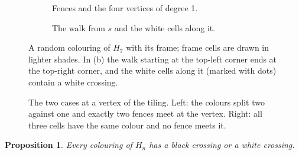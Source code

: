 \documentclass[11pt,a4paper]{amsart}
\newtheorem{proposition}[theorem]{Proposition}
\theoremstyle{definition}
\theoremstyle{remark}
\begin{document}
\begin{figure}[t]
  \centering
  \begin{subfigure}[b]{0.49\textwidth}
    \centering
    \begin{tikzpicture}[x=0.34cm,y=0.34cm]
      
    \end{tikzpicture}
    \caption{Fences and the four vertices of degree 1.}\label{fig:walk-a}
  \end{subfigure}\hfill
  \begin{subfigure}[b]{0.49\textwidth}
    \centering
    \begin{tikzpicture}[x=0.34cm,y=0.34cm]
      
    \end{tikzpicture}
    \caption{The walk from $s$ and the white cells along it.}\label{fig:walk-b}
  \end{subfigure}
  \caption{A random colouring of $H_7$ with its frame; frame cells are drawn in lighter shades. In (b) the walk starting at the top-left corner ends at the top-right corner, and the white cells along it (marked with dots) contain a white crossing.}\label{fig:walk}
\end{figure}

\begin{figure}[t]
  \centering
  \begin{tikzpicture}[x=0.55cm,y=0.55cm]
    
  \end{tikzpicture}
  \caption{The two cases at a vertex of the tiling. Left: the colours split two against one and exactly two fences meet at the vertex. Right: all three cells have the same colour and no fence meets it.}\label{fig:vertex}
\end{figure}

\begin{proposition}\label{prop:existence}
Every colouring of $H_n$ has a black crossing or a white crossing.
\end{proposition}
\end{document}
